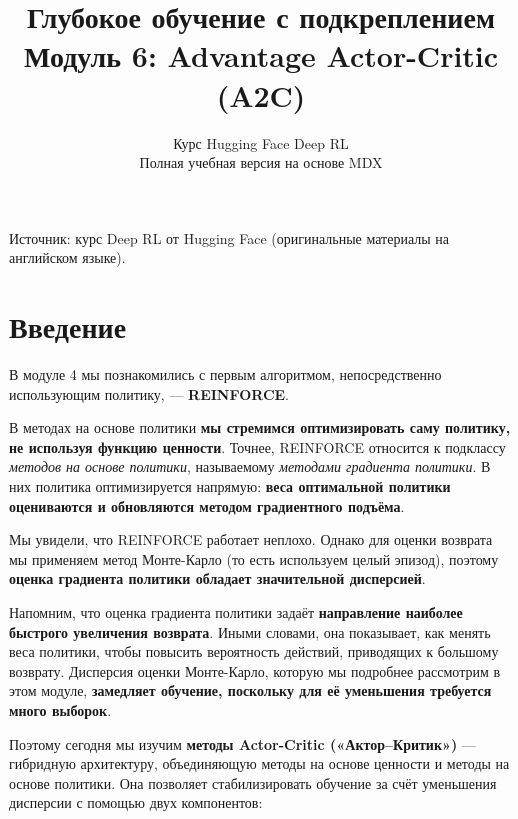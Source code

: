 \documentclass[11pt,a4paper]{article}
\title{\textbf{Глубокое обучение с подкреплением}\\[0.35em]\large Модуль 6: Advantage Actor-Critic (A2C)}
\author{Курс Hugging Face Deep RL\\\small Полная учебная версия на основе MDX}
\date{}
\begin{document}
\selectfont
\maketitle
\vspace{-0.8em}
\begin{center}\small\color{secondary}Источник: курс Deep RL от Hugging Face (оригинальные материалы на английском языке).\end{center}
\begingroup\small\setlength{\parskip}{0pt}\tableofcontents\endgroup
\vspace{0.5em}
\clearpage

\section{Введение}\label{introduction}


В модуле 4 мы познакомились с первым алгоритмом, непосредственно использующим политику, --- \textbf{REINFORCE}.

В методах на основе политики \textbf{мы стремимся оптимизировать саму политику, не используя функцию ценности}. Точнее, REINFORCE относится к подклассу \emph{методов на основе политики}, называемому \emph{методами градиента политики}. В них политика оптимизируется напрямую: \textbf{веса оптимальной политики оцениваются и обновляются методом градиентного подъёма}.

Мы увидели, что REINFORCE работает неплохо. Однако для оценки возврата мы применяем метод Монте-Карло (то есть используем целый эпизод), поэтому \textbf{оценка градиента политики обладает значительной дисперсией}.

Напомним, что оценка градиента политики задаёт \textbf{направление наиболее быстрого увеличения возврата}. Иными словами, она показывает, как менять веса политики, чтобы повысить вероятность действий, приводящих к большому возврату. Дисперсия оценки Монте-Карло, которую мы подробнее рассмотрим в этом модуле, \textbf{замедляет обучение, поскольку для её уменьшения требуется много выборок}.

Поэтому сегодня мы изучим \textbf{методы Actor-Critic («Актор--Критик»)} --- гибридную архитектуру, объединяющую методы на основе ценности и методы на основе политики. Она позволяет стабилизировать обучение за счёт уменьшения дисперсии с помощью двух компонентов:
\end{document}
